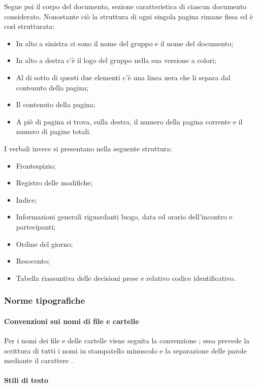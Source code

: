 Segue poi il corpo del documento, sezione caratteristica di ciascun documento considerato. Nonostante ciò la struttura
di ogni singola pagina rimane fissa ed è così strutturata:
\begin{itemize}
    \item In alto a sinistra ci sono il nome del gruppo e il nome del documento;
    \item In alto a destra c'è il logo del gruppo nella sua versione a colori;
    \item Al di sotto di questi due elementi c'è una linea nera che li separa dal contenuto della pagina;
    \item Il contenuto della pagina;
    \item A piè di pagina si trova, sulla destra, il numero della pagina corrente e il numero di pagine totali.
\end{itemize}
I verbali invece si presentano nella seguente struttura:
\begin{itemize}
    \item Frontespizio;
    \item Registro delle modifiche;
    \item Indice;
    \item Informazioni generali riguardanti luogo, data ed orario dell'incontro e partecipanti;
    \item Ordine del giorno;
    \item Resoconto;
    \item Tabella riassuntiva delle decisioni prese e relativo codice identificativo.
\end{itemize}

\subsubsection{Norme tipografiche}
\label{ssub:norme_tipografiche}

\paragraph{Convenzioni sui nomi di file e cartelle}
\label{par:attribuzione_nome}

Per i nomi dei file e delle cartelle viene seguita la convenzione ; essa prevede la scrittura di tutti i nomi in stampatello
minuscolo e la separazione delle parole mediante il carattere .

\paragraph{Stili di testo}
\label{par:stili_testo}


